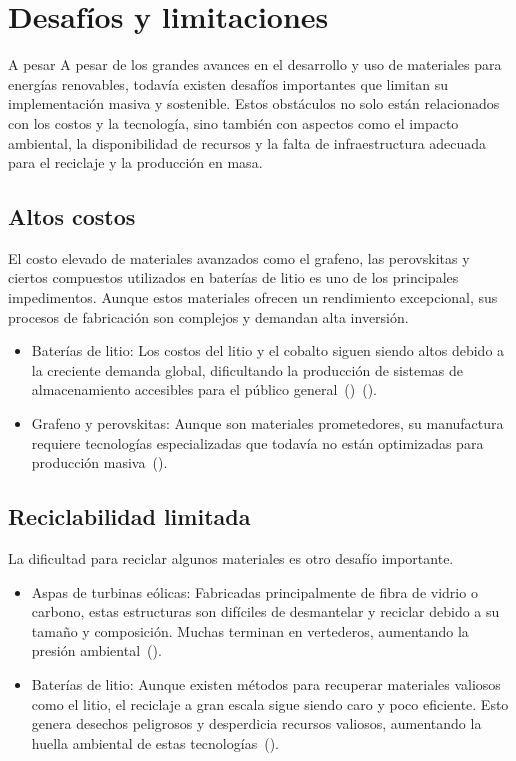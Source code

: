 \documentclass[letterpaper, 12pt]{article}
\begin{document}
\section{Desafíos y limitaciones}

A pesar A pesar de los grandes avances en el desarrollo y uso de materiales
para energías renovables, todavía existen desafíos importantes que limitan su
implementación masiva y sostenible. Estos obstáculos no solo están relacionados
con los costos y la tecnología, sino también con aspectos como el impacto
ambiental, la disponibilidad de recursos y la falta de infraestructura adecuada
para el reciclaje y la producción en masa.

\subsection*{Altos costos}

El costo elevado de materiales avanzados como el grafeno, las perovskitas y
ciertos compuestos utilizados en baterías de litio es uno de los principales
impedimentos. Aunque estos materiales ofrecen un rendimiento excepcional, sus
procesos de fabricación son complejos y demandan alta inversión.

\begin{itemize}
      \item Baterías de litio: Los costos del litio y el cobalto siguen siendo altos debido
            a la creciente demanda global, dificultando la producción de sistemas de
            almacenamiento accesibles para el público
            general~(\cite{Ebhota_Jen2019})~(\cite{Uyor2021}).

      \item Grafeno y perovskitas: Aunque son materiales prometedores, su manufactura
            requiere tecnologías especializadas que todavía no están optimizadas para
            producción masiva~(\cite{Henriksson2021}).
\end{itemize}

\subsection*{Reciclabilidad limitada}

La dificultad para reciclar algunos materiales es otro desafío importante.

\begin{itemize}
      \item Aspas de turbinas eólicas: Fabricadas principalmente de fibra de vidrio o
            carbono, estas estructuras son difíciles de desmantelar y reciclar debido a su
            tamaño y composición. Muchas terminan en vertederos, aumentando la presión
            ambiental~(\cite{Henriksson2021}).

      \item Baterías de litio: Aunque existen métodos para recuperar materiales valiosos
            como el litio, el reciclaje a gran escala sigue siendo caro y poco eficiente.
            Esto genera desechos peligrosos y desperdicia recursos valiosos, aumentando la
            huella ambiental de estas tecnologías~(\cite{Galembeck2019}).
\end{itemize}
\end{document}
